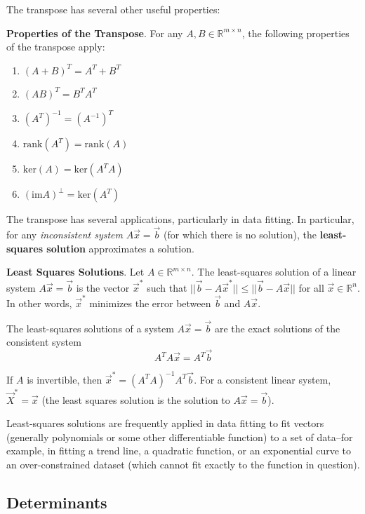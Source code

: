 The transpose has several other useful properties:

\begin{shaded}
    \textbf{Properties of the Transpose}. For any $A,B\in\mathbb{R}^{m\times n}$, the following properties of the transpose apply:
    \begin{enumerate}
        \item $(A+B)^T = A^T + B^T$
        \item $(AB)^T = B^TA^T$
        \item $(A^T)^{-1} = (A^{-1})^T$
        \item $\text{rank}(A^T) = \text{rank}(A)$
        \item $\text{ker}(A)=\text{ker}(A^TA)$
        \item $(\text{im}A)^\perp = \text{ker}(A^T)$
    \end{enumerate}
\end{shaded}

The transpose has several applications, particularly in data fitting. In particular, for any \textit{inconsistent system} $A\vec{x}=\vec{b}$ (for which there is no solution), the \textbf{least-squares solution} approximates a solution.

\begin{shaded}
\textbf{Least Squares Solutions}. Let $A\in\mathbb{R}^{m\times n}$. The least-squares solution of a linear system $A\vec{x} = \vec{b}$ is the vector $\vec{x}^*$ such that $||\vec{b}-A\vec{x}^*|| \leq ||\vec{b}-A\vec{x}||$ for all $\vec{x}\in\mathbb{R}^n$. In other words, $\vec{x}^*$ minimizes the error between $\vec{b}$ and $A\vec{x}$.

The least-squares solutions of a system $A\vec{x}=\vec{b}$ are the exact solutions of the consistent system \[A^TA\vec{x} = A^T\vec{b}\]
\end{shaded}

If $A$ is invertible, then $\vec{x}^* = (A^TA)^{-1}A^T\vec{b}$. For a consistent linear system, $\vec{X}^* = \vec{x}$ (the least squares solution is the solution to $A\vec{x} = \vec{b}$).

Least-squares solutions are frequently applied in data fitting to fit vectors (generally polynomials or some other differentiable function) to a set of data--for example, in fitting a trend line, a quadratic function, or an exponential curve to an over-constrained dataset (which cannot fit exactly to the function in question).


\newpage

\subsection{Determinants}


